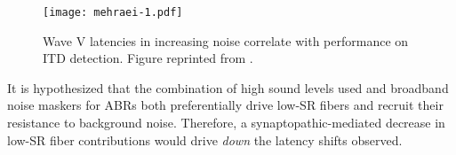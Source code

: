 \begin{figure}[htbp]
	\centering
	\texttt{[image: mehraei-1.pdf]}
	\caption[Wave V latency in noise]{Wave V latencies in increasing noise correlate with performance on ITD detection.  Figure reprinted from \cite{Mehraei2016Auditory}.}
	\label{fig:mehraei-1}
\end{figure}

It is hypothesized that the combination of high sound levels used and broadband noise maskers for ABRs both preferentially drive low-SR fibers and recruit their resistance to background noise.  Therefore, a synaptopathic-mediated decrease in low-SR fiber contributions would drive \emph{down} the latency shifts observed.
